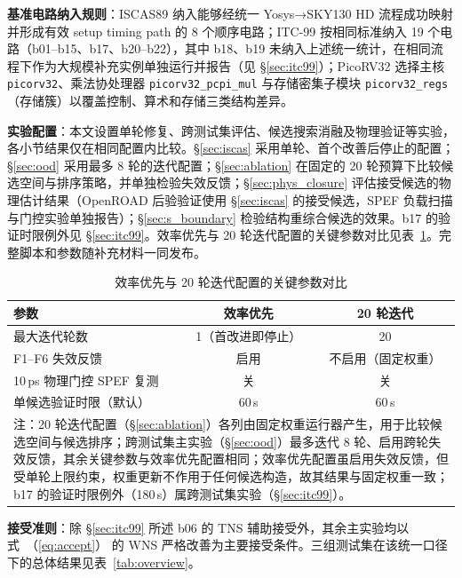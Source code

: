 \documentclass[twocolumn,10pt,fontset=windows]{ctexart}
\renewcommand{\eqref}[1]{\textup{（\ref{#1}）}}
\begin{document}
\textbf{基准电路纳入规则}：ISCAS89 纳入能够经统一 Yosys→SKY130 HD 流程成功映射并形成有效 setup timing path 的 8 个顺序电路；ITC-99 按相同标准纳入 19 个电路（b01--b15、b17、b20--b22），其中 b18、b19 未纳入上述统一统计，在相同流程下作为大规模补充实例单独运行并报告（见 \S\ref{sec:itc99}）；PicoRV32 选择主核 \texttt{picorv32}、乘法协处理器 \texttt{picorv32\_pcpi\_mul} 与存储密集子模块 \texttt{picorv32\_regs}（存储簇）以覆盖控制、算术和存储三类结构差异。

\textbf{实验配置}：本文设置单轮修复、跨测试集评估、候选搜索消融及物理验证等实验，各小节结果仅在相同配置内比较。\S\ref{sec:iscas} 采用单轮、首个改善后停止的配置；\S\ref{sec:ood} 采用最多 8 轮的迭代配置；\S\ref{sec:ablation} 在固定的 20 轮预算下比较候选空间与排序策略，并单独检验失效反馈；\S\ref{sec:phys_closure} 评估接受候选的物理估计结果（OpenROAD 后验验证使用 \S\ref{sec:iscas} 的接受候选，SPEF 负载扫描与门控实验单独报告）；\S\ref{sec:s_boundary} 检验结构重综合候选的效果。b17 的验证时限例外见 \S\ref{sec:itc99}。效率优先与 20 轮迭代配置的关键参数对比见表~\ref{tab:configs}。完整脚本和参数随补充材料一同发布。

\begin{table}[!htb]
\centering
\caption{效率优先与 20 轮迭代配置的关键参数对比}
\label{tab:configs}
\scriptsize
\setlength{\tabcolsep}{4pt}
\begin{tabular}{lcc}
\toprule
\textbf{参数} & \textbf{效率优先} & \textbf{20 轮迭代} \\
\midrule
最大迭代轮数                    & 1（首改进即停止） & 20 \\
F1--F6 失效反馈                  & 启用 & 不启用（固定权重） \\
10\,ps 物理门控 SPEF 复测        & 关 & 关 \\
单候选验证时限（默认）           & 60\,s & 60\,s \\
\bottomrule
\multicolumn{3}{p{0.95\columnwidth}}{\footnotesize 注：20 轮迭代配置（\S\ref{sec:ablation}）各列由固定权重运行器产生，用于比较候选空间与候选排序；跨测试集主实验（\S\ref{sec:ood}）最多迭代 8 轮、启用跨轮失效反馈，其余关键参数与效率优先配置相同；效率优先配置虽启用失效反馈，但受单轮上限约束，权重更新不作用于任何候选构造，故其结果与固定权重一致；b17 的验证时限例外（180\,s）属跨测试集实验（\S\ref{sec:itc99}）。}\\
\end{tabular}
\end{table}

\textbf{接受准则}：除 \S\ref{sec:itc99} 所述 b06 的 TNS 辅助接受外，其余主实验均以式~\eqref{eq:accept} 的 WNS 严格改善为主要接受条件。三组测试集在该统一口径下的总体结果见表~\ref{tab:overview}。
\end{document}
